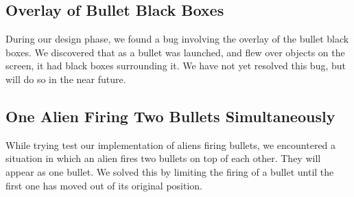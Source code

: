 \documentclass[11pt,letter,oneside]{report}
\begin{document}
\subsection{Overlay of Bullet Black Boxes}
During our design phase, we found a bug involving the overlay of the bullet black boxes. We discovered that as a bullet was launched, and flew over objects on the screen, it had black boxes surrounding it. We have not yet resolved this bug, but will do so in the near future.

\subsection{One Alien Firing Two Bullets Simultaneously}
While trying test our implementation of aliens firing bullets, we encountered a situation in which an alien fires two bullets on top of each other.  They will appear as one bullet.  We solved this by limiting the firing of a bullet until the first one has moved out of its original position. 
\end{document}
